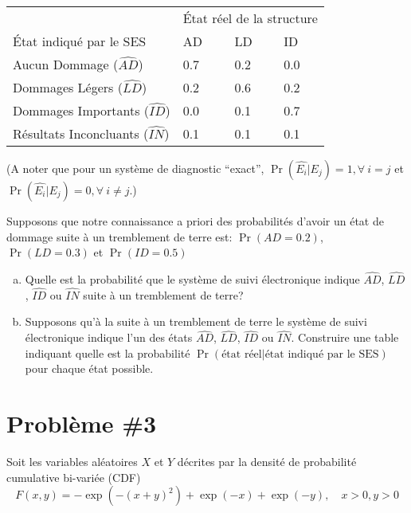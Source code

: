 \documentclass[letterpaper]{article}
\begin{document}
\begin{table}[htbp]
\centering
\begin{tabular}{llll}
\toprule
& \multicolumn{3}{c}{\parbox{2cm}{\centering État réel de la structure}} \\
\addlinespace
État indiqué par le SES & AD & LD & ID\\
\cmidrule{1-4}
Aucun Dommage ($\widehat{\mathit{AD}}$) & 0.7 & 0.2 & 0.0\\
Dommages Légers ($\widehat{\mathit{LD}}$) & 0.2 & 0.6 & 0.2\\
Dommages Importants ($\widehat{\mathit{ID}}$) & 0.0 & 0.1 & 0.7\\
Résultats Inconcluants ($\widehat{\mathit{IN}}$) & 0.1 & 0.1 & 0.1\\
\bottomrule
\end{tabular}
\end{table}
(A noter que pour un système de diagnostic ``exact'', $\Pr(\widehat{E_i}|E_j)=1, \forall~ i=j$ et $\Pr(\widehat{E_i}|E_j)=0, \forall~ i\neq j$.) 

Supposons que notre connaissance a priori des probabilités d'avoir un état de dommage suite à un tremblement de terre est: $\Pr(\mathit{AD}=0.2)$, $\Pr(\mathit{LD}=0.3)$ et $\Pr(\mathit{ID}=0.5)$ 

\begin{enumerate}[a)]
\item Quelle est la probabilité que le système de suivi électronique indique $\widehat{\mathit{AD}}$, $\widehat{\mathit{LD}}$, $\widehat{\mathit{ID}}$ ou $\widehat{\mathit{IN}}$ suite à un tremblement de terre?  
\item Supposons qu'à la suite à un tremblement de terre le système de suivi électronique indique l'un des états $\widehat{\mathit{AD}}$, $\widehat{\mathit{LD}}$, $\widehat{\mathit{ID}}$ ou $\widehat{\mathit{IN}}$. Construire une table indiquant quelle est la probabilité $\Pr(\text{état réel}|\text{état indiqué par le SES})$ pour chaque état possible.

\end{enumerate}
\newpage
\section*{Problème \#3}
Soit les variables aléatoires $X$ et $Y$ décrites par la densité de probabilité cumulative bi-variée (CDF)
\begin{equation}
F(x,y)=-\exp(-(x+y)^2)+\exp(-x)+\exp(-y),\quad x>0, y>0 
\end{equation} 
\end{document}
